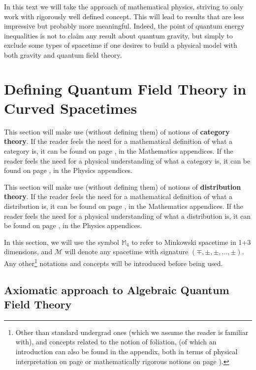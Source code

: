 \documentclass[a4paper,11pt]{article}
\numberwithin{equation}{section}
\theoremstyle{definition}
\begin{document}
In this \color{red} text \color{black} we will take the approach of mathematical physics, striving to only work with rigorously well defined concept. This will lead to results that are less impressive but probably more meaningful. Indeed, the point of quantum energy inequalities is not to claim any result about quantum gravity, but simply to exclude some types of spacetime if one desires to build a physical model with both gravity and quantum field theory. 
\newpage
\tableofcontents
\newpage
\section{Defining Quantum Field Theory in Curved Spacetimes}
This section will make use (without defining them) of notions of \textbf{category theory}. If the reader feels the need for a mathematical definition of what a category is, it can be found on page \pageref{AnMaCat}, in the Mathematics appendices. If the reader feels the need for a physical understanding of what a category is, it can be found on page \pageref{AnPhCat}, in the Physics appendices.

This section will make use (without defining them) of notions of \textbf{distribution theory}. If the reader feels the need for a mathematical definition of what a distribution is, it can be found on page \pageref{DistribMath}, in the Mathematics appendices. If the reader feels the need for a physical understanding of what a distribution is, it can be found on page \pageref{DistribPhy}, in the Physics appendices.

In this section, we will use the symbol $\mathbb{M}_4$ to refer to Minkowski spacetime in 1+3 dimensions, and $\mathcal{M}$ will denote any spacetime with signature $(\mp, \pm,\pm, ..., \pm)$. Any other\footnote{Other than standard undergrad ones (which we assume the reader is familiar with), and concepts related to the notion of foliation, (of which an introduction can also be found in the appendix, both in terms of physical interpretation on page \pageref{PhyFoli} or mathematically rigorous notions on page \pageref{MatFoli}).} notations and concepts will be introduced before being used.

\subsection{Axiomatic approach to Algebraic Quantum Field Theory}
\end{document}
